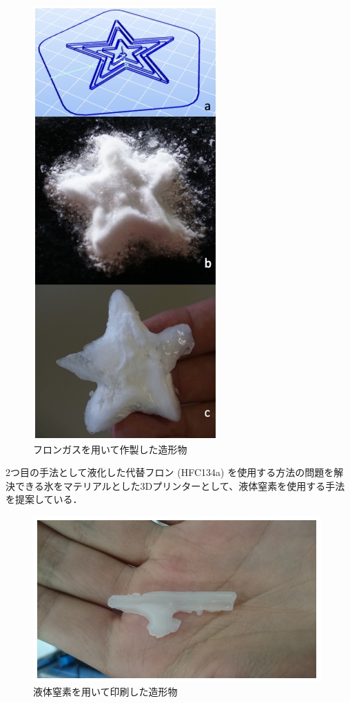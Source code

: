 \begin{figure}[H]
  \centering
  \includegraphics[width=6truecm]{./fig/erusa1.jpg}
  \caption{フロンガスを用いて作製した造形物}
  \label{fig:ferret}
\end{figure}

2つ目の手法として液化した代替フロン (HFC134a) を使用する方法の問題を解決できる氷をマテリアルとした3Dプリンターとして、液体窒素を使用する手法を提案している．

\begin{figure}[H]
  \centering
  \includegraphics[width=10truecm]{./fig/erusa2.jpg}
  \caption{液体窒素を用いて印刷した造形物}
  \label{fig:ferret}
\end{figure}

